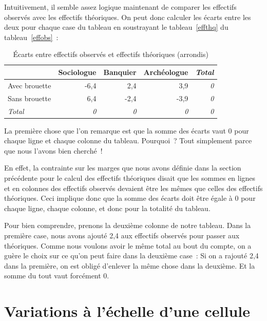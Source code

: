\documentclass[a4paper,10pt,twoside,francais]{report}
\begin{document}
Intuitivement, il semble assez logique maintenant de comparer les
effectifs observés avec les effectifs théoriques. On peut donc
calculer les écarts entre les deux pour chaque case du tableau en
soustrayant le tableau~\ref{effthq} du tableau~\ref{effobs}~:

\begin{table}[H]
  \begin{center}
    \begin{tabular}{lrrr>{\itshape}r}
      \toprule
      & Sociologue & Banquier & Archéologue  & Total\\
      \midrule
      Avec brouette &  -6,4 & 2,4 & 3,9 &  0\\
      Sans brouette &  6,4 & -2,4 & -3,9 &  0\\
      \textit{Total} & \textit{0} & \textit{0} & \textit{0} & \textit{0}\\
      \bottomrule
    \end{tabular}
    \caption{Écarts entre effectifs observés et effectifs théoriques (arrondis)}
    \label{ecarts}
  \end{center}
\end{table}

La première chose que l'on remarque est que la somme des écarts vaut
0 pour chaque ligne et chaque colonne du tableau. Pourquoi~? Tout
simplement parce que nous l'avons bien cherché~!

\label{contrmarges}
En effet, la contrainte sur les marges que nous avons définie dans la
section précédente pour le calcul des effectifs théoriques disait que
les sommes en lignes et en colonnes des effectifs observés devaient
être les mêmes que celles des effectifs théoriques. Ceci implique donc
que la somme des écarts doit être égale à 0 pour chaque ligne, chaque
colonne, et donc pour la totalité du tableau.

Pour bien comprendre, prenons la deuxième colonne de notre
tableau. Dans la première case, nous avons ajouté 2,4 aux effectifs
observés pour passer aux théoriques. Comme nous voulons avoir le même
total au bout du compte, on a guère le choix sur ce qu'on peut faire
dans la deuxième case~: Si on a rajouté 2,4 dans la première, on est
obligé d'enlever la même chose dans la deuxième. Et la somme du tout
vaut forcément 0.


\section{Variations à l'échelle d'une cellule}
\label{secvarcel}
\end{document}
